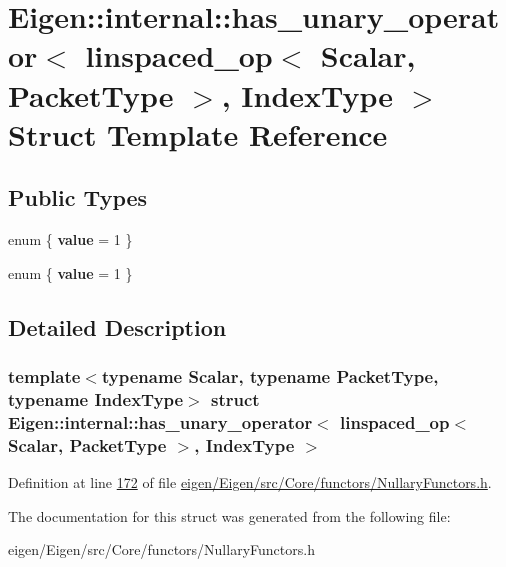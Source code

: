 \hypertarget{struct_eigen_1_1internal_1_1has__unary__operator_3_01linspaced__op_3_01_scalar_00_01_packet_type_01_4_00_01_index_type_01_4}{}\section{Eigen\+:\+:internal\+:\+:has\+\_\+unary\+\_\+operator$<$ linspaced\+\_\+op$<$ Scalar, Packet\+Type $>$, Index\+Type $>$ Struct Template Reference}
\label{struct_eigen_1_1internal_1_1has__unary__operator_3_01linspaced__op_3_01_scalar_00_01_packet_type_01_4_00_01_index_type_01_4}
\subsection*{Public Types}
\begin{DoxyCompactItemize}
\item 
\mbox{\label{struct_eigen_1_1internal_1_1has__unary__operator_3_01linspaced__op_3_01_scalar_00_01_packet_type_01_4_00_01_index_type_01_4_ad35c2e91d148a336fa5fbd4ab3db8602}} 
enum \{ {\bfseries value} = 1
 \}
\item 
\mbox{\label{struct_eigen_1_1internal_1_1has__unary__operator_3_01linspaced__op_3_01_scalar_00_01_packet_type_01_4_00_01_index_type_01_4_a610320250732cf3c2b9395b02b764fb3}} 
enum \{ {\bfseries value} = 1
 \}
\end{DoxyCompactItemize}


\subsection{Detailed Description}
\subsubsection*{template$<$typename Scalar, typename Packet\+Type, typename Index\+Type$>$\newline
struct Eigen\+::internal\+::has\+\_\+unary\+\_\+operator$<$ linspaced\+\_\+op$<$ Scalar, Packet\+Type $>$, Index\+Type $>$}



Definition at line \hyperlink{eigen_2_eigen_2src_2_core_2functors_2_nullary_functors_8h_source_l00172}{172} of file \hyperlink{eigen_2_eigen_2src_2_core_2functors_2_nullary_functors_8h_source}{eigen/\+Eigen/src/\+Core/functors/\+Nullary\+Functors.\+h}.



The documentation for this struct was generated from the following file\+:\begin{DoxyCompactItemize}
\item 
eigen/\+Eigen/src/\+Core/functors/\+Nullary\+Functors.\+h\end{DoxyCompactItemize}
